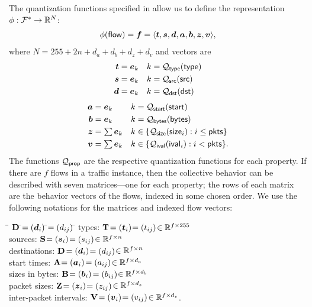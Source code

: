 \documentclass[twocolumn,final]{svjour3}
\begin{document}
The quantization functions specified in  allow us to define the representation $\phi: \mathcal{F}^* \to \mathbb{R}^N$: \begin{align}
\phi(\flow) = \vec{f} = \tuple{\vec{t},\vec{s},\vec{d},\vec{a},\vec{b},\vec{z},\vec{v}},
\end{align}
where $N=255+2n+d_a+d_b+d_z+d_v$ and vectors are
\begin{align*}
\vec{t} &= \e_k & k &= \Qf_\type(\type) \\
\vec{s} &= \e_k & k &= \Qf_\src(\src) \\
\vec{d} &= \e_k & k &= \Qf_\dst(\dst)
\end{align*}
\begin{align*}
\vec{a} &= \e_k & k &= \Qf_\start(\start) \\
\vec{b} &= \e_k & k &= \Qf_\bytes(\bytes) \\
\vec{z} &= {\textstyle \sum \e_k} & k &\in \set{\Qf_\size(\size_i) : i \le \pkts} \\
\vec{v} &= {\textstyle \sum \e_k} & k &\in \set{\Qf_\ival(\ival_i) : i <   \pkts}.
\end{align*}
The functions $\mathcal{Q}_{\text{\textsf{prop}}}$ are the respective quantization functions for each property.
If there are $f$ flows in a traffic instance, then the collective behavior can be described with seven matrices---one for each property;
the rows of each matrix are the behavior vectors of the flows, indexed in some chosen order.
We use the following notations for the matrices and indexed flow vectors:
\vspace{-0.25em}
\begin{tabbing}
\hspace{1em}\=\bullet\hspace{0.5em}\=\hspace{9.75em}\=
$\mathbf{D}\:$\=$=\parensx{\vec{d}_i}\:$\=$={(d_{ij})}\:$\=\kill
\>\bullet\> types: \>$\mathbf{T}$\>$=\parensx{\vec{t}_i}$\>$={(t_{ij})}$\>$\in\mathbb{R}^{f \times 255}$\\
\>\bullet\> sources: \>$\mathbf{S}$\>$=\parensx{\vec{s}_i}$\>$={(s_{ij})}$\>$\in\mathbb{R}^{f \times n}$\\
\>\bullet\> destinations: \>$\mathbf{D}$\>$=\parensx{\vec{d}_i}$\>$={(d_{ij})}$\>$\in\mathbb{R}^{f \times n}$\\
\>\bullet\> start times: \>$\mathbf{A}$\>$=\parensx{\vec{a}_i}$\>$={(a_{ij})}$\>$\in\mathbb{R}^{f \times d_a}$\\
\>\bullet\> sizes in bytes: \>$\mathbf{B}$\>$=\parensx{\vec{b}_i}$\>$={(b_{ij})}$\>$\in\mathbb{R}^{f \times d_b}$\\
\>\bullet\> packet sizes: \>$\mathbf{Z}$\>$=\parensx{\vec{z}_i}$\>$={(z_{ij})}$\>$\in\mathbb{R}^{f \times d_z}$\\
\>\bullet\> inter-packet intervals: \>$\mathbf{V}$\>$=\parensx{\vec{v}_i}$\>$={(v_{ij})}$\>$\in\mathbb{R}^{f \times d_v}$.
\end{tabbing}
\end{document}
